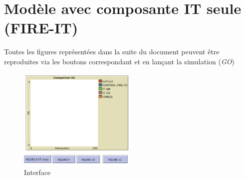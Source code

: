 
\section{Modèle avec composante IT seule (FIRE-IT)}
Toutes les figures représentées dans la suite du document peuvent être reproduites via les boutons correspondant et en lançant la simulation (\textit{GO})
\begin{figure}[H]
\centering
\captionsetup{justification=centering}
\includegraphics[width=0.5\textwidth]{images/captureInterface.png}
\caption{Interface}
\label{fig:interface}
\end{figure}


